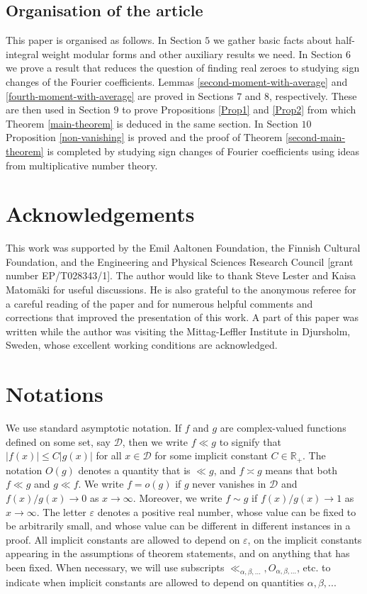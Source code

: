 \documentclass[a4paper,10pt,twoside]{amsart}
\theoremstyle{definition}
\numberwithin{equation}{section}
\renewcommand\:{\colon}
\begin{document}
\subsection{Organisation of the article}

This paper is organised as follows. In Section $5$ we gather basic facts about half-integral weight modular forms and other auxiliary results we need. In Section $6$ we prove a result that reduces the question of finding real zeroes to studying sign changes of the Fourier coefficients. Lemmas \ref{second-moment-with-average} and \ref{fourth-moment-with-average} are proved in Sections $7$ and $8$, respectively. These are then used in Section $9$ to prove Propositions \ref{Prop1} and \ref{Prop2} from which Theorem \ref{main-theorem} is deduced in the same section. In Section $10$ Proposition \ref{non-vanishing} is proved and the proof of Theorem \ref{second-main-theorem} is completed by studying sign changes of Fourier coefficients using ideas from multiplicative number theory. 

\section{Acknowledgements}

\noindent This work was supported by the Emil Aaltonen Foundation, the Finnish Cultural Foundation, and the Engineering and Physical Sciences Research Council [grant number EP/T028343/1]. The author would like to thank Steve Lester and Kaisa Matom\"aki for useful discussions. He is also grateful to the anonymous referee for a careful reading of the paper and for numerous helpful comments and corrections that improved the presentation of this work. A part of this paper was written while the author was visiting the Mittag-Leffler Institute in Djursholm, Sweden, whose excellent working conditions are acknowledged. 

\section{Notations}

\noindent We use standard asymptotic notation. If $f$ and $g$ are complex-valued functions defined on some set, say $\mathcal D$, then we write $f\ll g$ to  signify that $|f(x)|\leqslant C|g(x)|$ for all $x\in\mathcal D$ for some implicit constant $C\in\mathbb R_+$. The notation $O(g)$ denotes a quantity that is $\ll g$, and $f\asymp g$ means that both $f\ll g$ and $g\ll f$. We write $f=o(g)$ if $g$ never vanishes in $\mathcal D$ and $f(x)/g(x)\longrightarrow 0$ as $x\longrightarrow\infty$. Moreover, we write $f\sim g$ if $f(x)/g(x)\longrightarrow 1$ as $x\longrightarrow\infty$. The letter $\varepsilon$ denotes a positive real number, whose value can be fixed to be arbitrarily small, and whose value can be different in different instances in a proof.  All implicit constants are allowed to depend on $\varepsilon$, on the implicit constants appearing in the assumptions of theorem statements, and on anything that has been fixed. When necessary, we will use subscripts $\ll_{\alpha,\beta,...},O_{\alpha,\beta,...}$, etc. to indicate when implicit constants are allowed to depend on quantities $\alpha,\beta,...$
\end{document}
